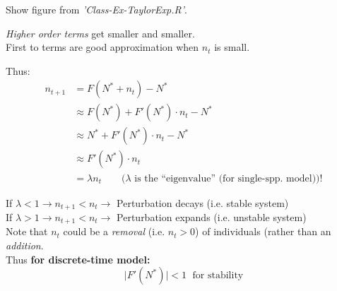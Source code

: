 \documentclass{article}
\newcommand{\note}[1]{\colorbox{gray!30}{#1}}
\begin{document}
\begin{center}
\note{Show figure from \emph{'Class-Ex-TaylorExp.R'}.}
\end{center}

\emph{Higher order terms} get smaller and smaller.\\
First to terms are good approximation when $n_t$ is small.

Thus:
\begin{align*}
	n_{t+1}& =F(N^*+n_t)-N^*\\
	& \approx F(N^*)+F'(N^*) \cdot n_t - N^*\\
	& \approx N^* + F'(N^*) \cdot n_t - N^*\\
	& \approx F'(N^*) \cdot n_t \\
	& = \lambda n_t \quad \quad (\lambda \text{ is the ``eigenvalue'' (for single-spp. model))!}
\end{align*}

\vspace{1cm}

If $\lambda <1 \to n_{t+1} < n_t \to $ Perturbation decays (i.e. stable system)\\
If $\lambda > 1 \to n_{t+1} < n_t \to $ Perturbation expands (i.e. unstable system)\\

Note that $n_t$ could be a \emph{removal} (i.e. $n_t>0$) of individuals (rather than an \emph{addition}.\\

Thus \textbf{for discrete-time model:}\\
\begin{equation*}
\boxed{\vert F'(N^*)\vert < 1 \; \text{ for stability}}
\end{equation*}
\end{document}
